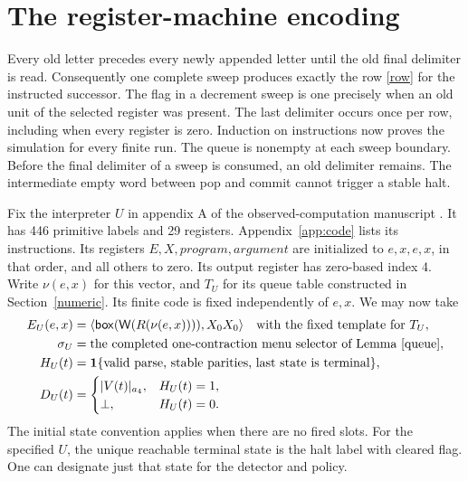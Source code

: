 \documentclass[11pt,letterpaper,oneside,reqno]{amsart}
\newcommand{\pair}[2]{\langle #1,#2\rangle}
\newcommand{\word}{\mathsf W}
\newcommand{\bx}[1]{\mathsf{box}(#1)}
\begin{document}
\section{The register-machine encoding}
Every old letter precedes every newly appended letter until the old final delimiter is read. Consequently one complete sweep produces exactly the row \eqref{row} for the instructed successor. The flag in a decrement sweep is one precisely when an old unit of the selected register was present. The last delimiter occurs once per row, including when every register is zero. Induction on instructions now proves the simulation for every finite run. The queue is nonempty at each sweep boundary. Before the final delimiter of a sweep is consumed, an old delimiter remains. The intermediate empty word between pop and commit cannot trigger a stable halt.

Fix the interpreter \(U\) in appendix A of the observed-computation manuscript \cite{observed}. It has 446 primitive labels and 29 registers. Appendix~\ref{app:code} lists its instructions. Its registers \(E,X,\mathit{program},\mathit{argument}\) are initialized to \(e,x,e,x\), in that order, and all others to zero. Its output register has zero-based index 4. Write \(\nu(e,x)\) for this vector, and \(T_U\) for its queue table constructed in Section~\ref{numeric}. Its finite code is fixed independently of \(e,x\). We may now take
\begin{align}
 E_U(e,x)&=\pair{\bx{\word(R(\nu(e,x)))}}{X_0 X_0}\quad
        \text{with the fixed template for }T_U, \notag\\
 \sigma_U&=\text{the completed one-contraction menu selector of Lemma \ref{queue}},\notag\\
 H_U(t)&=\mathbf 1\{\text{valid parse, stable parities, last state is terminal}\}, \notag\\
 D_U(t)&=
 \begin{cases}
    |V(t)|_{a_4}, & H_U(t)=1,\\
    \bot, & H_U(t)=0 .
 \end{cases}                                                     \label{maps}
\end{align}
The initial state convention applies when there are no fired slots. For the specified \(U\), the unique reachable terminal state is the halt label with cleared flag. One can designate just that state for the detector and policy.
\end{document}
